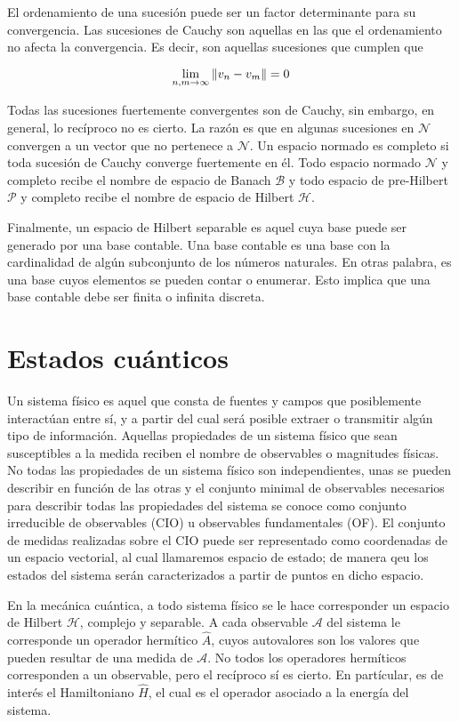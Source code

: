 El ordenamiento de una sucesión puede ser un factor determinante para su convergencia. Las sucesiones de Cauchy son aquellas en las que el ordenamiento no afecta la convergencia. Es decir, son aquellas sucesiones que cumplen que

\begin{equation}
    \lim_{n,m \to \infty} \norm{v_n - v_m} = 0
\end{equation}

Todas las sucesiones fuertemente convergentes son de Cauchy, sin embargo, en general, lo recíproco no es cierto. La razón es que en algunas sucesiones en $\mathcal{N}$ convergen a un vector que no pertenece a $\mathcal{N}$. Un espacio normado es completo si toda sucesión de Cauchy converge fuertemente en él. Todo espacio normado $\mathcal{N}$ y completo recibe el nombre de espacio de Banach $\mathcal{B}$ y todo espacio de pre-Hilbert $\mathcal{P}$ y completo recibe el nombre de espacio de Hilbert $\mathcal{H}$.

Finalmente, un espacio de Hilbert separable es aquel cuya base puede ser generado por una base contable. Una base contable es una base con la cardinalidad de algún subconjunto de los números naturales. En otras palabra, es una base cuyos elementos se pueden contar o enumerar. Esto implica que una base contable debe ser finita o infinita discreta.

\section{Estados cuánticos}

Un sistema físico es aquel que consta de fuentes y campos que posiblemente interactúan entre sí, y a partir del cual será posible extraer o transmitir algún tipo de información. Aquellas propiedades de un sistema físico que sean susceptibles a la medida reciben el nombre de observables o magnitudes físicas. No todas las propiedades de un sistema físico son independientes, unas se pueden describir en función de las otras y el conjunto minimal de observables necesarios para describir todas las propiedades del sistema se conoce como conjunto irreducible de observables (CIO) u observables fundamentales (OF). El conjunto de medidas realizadas sobre el CIO puede ser representado como coordenadas de un espacio vectorial, al cual llamaremos espacio de estado; de manera qeu los estados del sistema serán caracterizados a partir de puntos en dicho espacio.

En la mecánica cuántica, a todo sistema físico se le hace corresponder un espacio de Hilbert $\mathcal{H}$, complejo y separable. A cada observable $\mathcal{A}$ del sistema le corresponde un operador hermítico $\hat{A}$, cuyos autovalores son los valores que pueden resultar de una medida de $\mathcal{A}$. No todos los operadores hermíticos corresponden a un observable, pero el recíproco sí es cierto. En partícular, es de interés el Hamiltoniano $\hat{H}$, el cual es el operador asociado a la energía del sistema.

